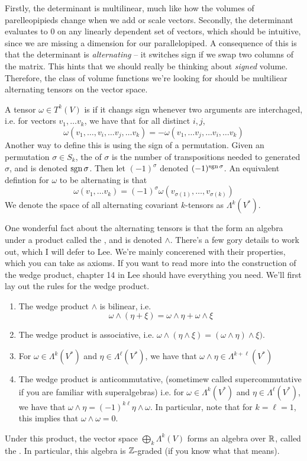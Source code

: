 Firstly, the determinant is multilinear, much like how the volumes of
parelleopipieds change when we add or scale vectors. Secondly, the determinant
evaluates to $0$ on any linearly dependent set of vectors, which should be
intuitive, since we are missing a dimension for our parallelopiped. A
consequence of this is that the determinant is \emph{alternating} -- it
switches sign if we swap two columns of the matrix. This hints that we
should really be thinking about \emph{signed} volume. Therefore, the class
of volume functions we're looking for should be multiliear alternating
tensors on the vector space.
%
\begin{defn}
A tensor $\omega \in T^k(V)$ is  if it changs sign whenever
two arguments are interchaged, i.e. for vectors $v_1, \ldots v_k$, we have that
for all distinct $i,j$,
$$\omega(v_1,\ldots, v_i, \ldots v_j, \ldots v_k) = -\omega(v_1, \ldots v_j, \ldots v_i, \ldots v_k) $$
Another way to define this is using the sign of a permutation. Given an permutation
$\sigma \in S_k$, the  of $\sigma$ is the number of transpositions
needed to generated $\sigma$, and is denoted $\operatorname{sgn} \sigma$. Then let $(-1)^\sigma$
denoted $(-1)^{\operatorname{sgn}\sigma}$. An equivalent defintion for $\omega$ to be alternating
is that
$$\omega(v_1, \ldots v_k) = (-1)^\sigma\omega(v_{\sigma(1)}, \ldots, v_{\sigma(k)}) $$
We denote the space of all alternating covariant $k$-tensors as $\Lambda^k(V^*)$.
\end{defn}
%
One wonderful fact about the alternating tensors is that the form an algebra under
a product called the , and is denoted $\wedge$.
There's a few gory details to work out, which I will defer to Lee. We're mainly
concerened with their properties, which you can take as axioms.
If you want to read more into the construction of the wedge product,
chapter 14 in Lee should have everything you need.
%
We'll first lay out the rules for the wedge product.
\begin{enumerate}
  \item The wedge product $\wedge$ is bilinear, i.e.
  $$\omega \wedge (\eta + \xi) = \omega \wedge \eta + \omega \wedge \xi $$
  \item The wedge product is associative, i.e. $\omega \wedge (\eta \wedge \xi)
  = (\omega \wedge \eta) \wedge \xi)$.
  \item For $\omega \in \Lambda^k(V^*)$
  and $\eta \in \Lambda^\ell(V^*)$, we have that
  $\omega \wedge \eta \in \Lambda^{k + \ell}(V^*)$
  \item The wedge product is anticommutative, (sometimew called supercommutative
  if you are familiar with superalgebras) i.e. for $\omega \in \Lambda^k(V^*)$
  and $\eta \in \Lambda^\ell(V^*)$, we have that
  $\omega \wedge \eta = (-1)^{k\ell}\eta \wedge \omega$. In particular,
  note that for $k = \ell = 1$, this implies that $\omega \wedge \omega = 0$.
\end{enumerate}
%
Under this product, the vector space $\bigoplus_{k} \Lambda^k(V)$ forms an
algebra over $\mathbb{R}$, called the . In particular, this algebra
is $\mathbb{Z}$-graded (if you know what that means).

